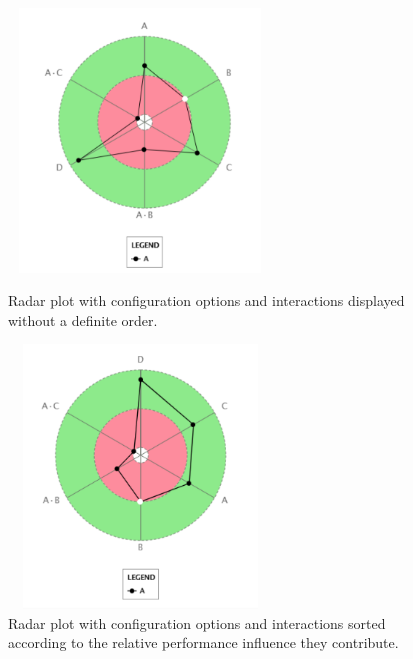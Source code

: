 \begin{myindentpar}{0cm}
\begin{figure}[H]
\centering
\begin{adjustbox}{width=1\textwidth}
\begin{minipage}[8cm]{.44\textwidth}
 \includegraphics[width=7cm,height=7cm,keepaspectratio,]{pics/sorted_order_before_radar.pdf}
\caption[Radar plot without sorting feature]{Radar plot with configuration options and interactions displayed without a definite order.}\label{relevanceBefore}
\vspace{\baselineskip}
\end{minipage}
\begin{minipage}[8cm]{.44\textwidth}
 \includegraphics[width=7cm,height=7cm,keepaspectratio,]{pics/sorted_order_after_radar.pdf}
\caption[Radar plot with sorting feature]{Radar plot with configuration options and interactions sorted according to the relative performance influence they contribute.} 
\label{relevanceAfter}
\vspace{\baselineskip}
\end{minipage}
\end{adjustbox}
\end{figure}

\end{myindentpar}
